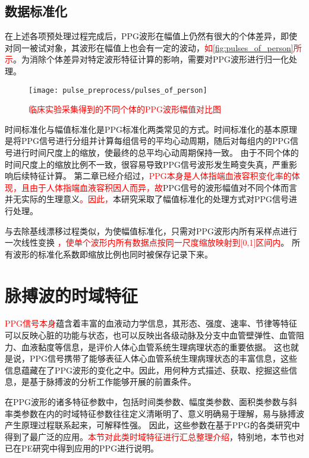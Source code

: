 \subsection{数据标准化}
在上述各项预处理过程完成后，PPG波形在幅值上仍然有很大的个体差异，即使对同一被试对象，其波形在幅值上也会有一定的波动，\textcolor{red}{如\autoref{fig:pulses_of_person}所示}。为消除个体差异对特定波形特征计算的影响，需要对PPG波形进行归一化处理。
\begin{figure}[htbp]
    \centering
    \texttt{[image: pulse\_preprocess/pulses\_of\_person]}
    \caption{\label{fig:pulses_of_person}\textcolor{red}{临床实验采集得到的不同个体的PPG波形幅值对比图}}
\end{figure}

时间标准化与幅值标准化是PPG标准化两类常见的方式\cite{mmt}。时间标准化的基本原理是将PPG信号进行分组并计算每组信号的平均心动周期，随后对每组内的PPG信号进行时间尺度上的缩放，使最终的总平均心动周期保持一致。
由于不同个体的时间尺度上的缩放比例不一致，很容易导致PPG信号波形发生畸变失真，严重影响后续特征计算。
第二章已经介绍过，\textcolor{red}{PPG本身是人体指端血液容积变化率的体现，且由于人体指端血液容积因人而异，故}PPG信号的波形幅值对不同个体而言并无实际的生理意义\textcolor{red}{。因此，}本研究采取了幅值标准化的处理方式对PPG信号进行处理。

与去除基线漂移过程类似，为使幅值标准化，只需对PPG波形内所有采样点进行一次线性变换
\textcolor{red}{，使单个波形内所有数据点按同一尺度缩放映射到[0,1]区间内}。
所有波形的标准化系数即缩放比例也同时被保存记录下来。

\section{脉搏波的时域特征}
\textcolor{red}{PPG信号本身}蕴含着丰富的血液动力学信息，其形态、强度、速率、节律等特征可以反映心脏的功能与状态，也可以反映出各级动脉及分支中血管壁弹性、血管阻力、血液黏度等信息，是评价人体心血管系统生理病理状态的重要依据\cite{PPGYY}。
这也就是说，PPG信号携带了能够表征人体心血管系统生理病理状态的丰富信息，这些信息蕴藏在了PPG波形的变化之中。因此，用何种方式描述、获取、挖掘这些信息，是基于脉搏波的分析工作能够开展的前置条件。

在PPG波形的诸多特征参数中，包括时间类参数、幅度类参数、面积类参数与斜率类参数在内的时域特征参数往往定义清晰明了、意义明确易于理解，易与脉搏波产生原理过程联系起来，可解释性强。
因此，这些参数在基于PPG的各类研究中得到了最广泛的应用\cite{cwl,mmt}。\textcolor{red}{本节对此类时域特征进行汇总整理介绍}，特别地，本节也对已在PE研究中得到应用的PPG进行说明。

